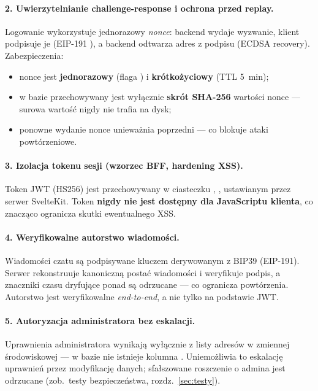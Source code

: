 \paragraph{2. Uwierzytelnianie challenge-response i ochrona przed replay.}
Logowanie wykorzystuje jednorazowy \emph{nonce}: backend wydaje wyzwanie, klient
podpisuje je (EIP-191 ), a backend odtwarza adres z podpisu
(ECDSA recovery). Zabezpieczenia:
\begin{itemize}
  \item nonce jest \textbf{jednorazowy} (flaga ) i \textbf{krótkożyciowy} (TTL 5~min);
  \item w bazie przechowywany jest wyłącznie \textbf{skrót SHA-256} wartości nonce —
        surowa wartość nigdy nie trafia na dysk;
  \item ponowne wydanie nonce unieważnia poprzedni — co blokuje ataki powtórzeniowe.
\end{itemize}

\paragraph{3. Izolacja tokenu sesji (wzorzec BFF, hardening XSS).}
Token JWT (HS256) jest przechowywany w ciasteczku ,
, ustawianym przez serwer SvelteKit. Token \textbf{nigdy nie jest
dostępny dla JavaScriptu klienta}, co znacząco ogranicza skutki ewentualnego XSS.

\paragraph{4. Weryfikowalne autorstwo wiadomości.}
Wiadomości czatu są podpisywane kluczem derywowanym z BIP39 (EIP-191). Serwer
rekonstruuje kanoniczną postać wiadomości i weryfikuje podpis, a znaczniki czasu
dryfujące ponad  są odrzucane — co ogranicza
powtórzenia. Autorstwo jest weryfikowalne \emph{end-to-end}, a nie tylko na podstawie JWT.

\paragraph{5. Autoryzacja administratora bez eskalacji.}
Uprawnienia administratora wynikają wyłącznie z listy adresów w zmiennej środowiskowej
 — w bazie nie istnieje kolumna . Uniemożliwia to
eskalację uprawnień przez modyfikację danych; sfałszowane roszczenie o admina jest
odrzucane (zob.\ testy bezpieczeństwa, rozdz.~\ref{sec:testy}).

